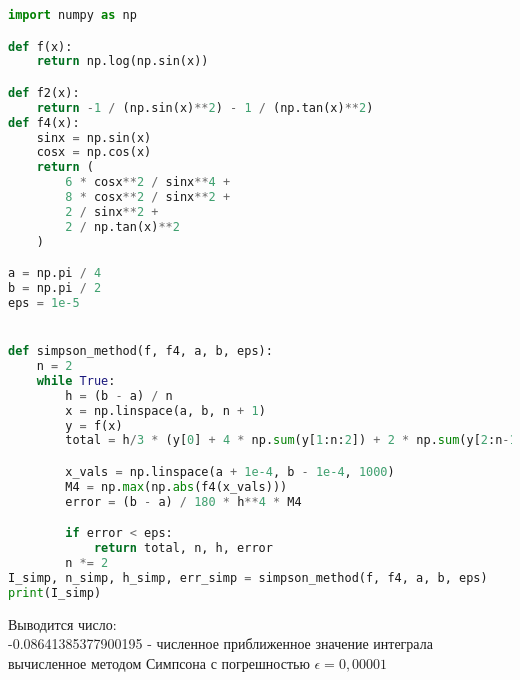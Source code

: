\documentclass{article}
\begin{document}
\begin{lstlisting}[language=Python]
import numpy as np

def f(x):
    return np.log(np.sin(x))

def f2(x):  
    return -1 / (np.sin(x)**2) - 1 / (np.tan(x)**2)
def f4(x):  
    sinx = np.sin(x)
    cosx = np.cos(x)
    return (
        6 * cosx**2 / sinx**4 +
        8 * cosx**2 / sinx**2 +
        2 / sinx**2 +
        2 / np.tan(x)**2
    )

a = np.pi / 4
b = np.pi / 2
eps = 1e-5


def simpson_method(f, f4, a, b, eps):
    n = 2
    while True:
        h = (b - a) / n
        x = np.linspace(a, b, n + 1)
        y = f(x)
        total = h/3 * (y[0] + 4 * np.sum(y[1:n:2]) + 2 * np.sum(y[2:n-1:2]) + y[n])

        x_vals = np.linspace(a + 1e-4, b - 1e-4, 1000)
        M4 = np.max(np.abs(f4(x_vals)))
        error = (b - a) / 180 * h**4 * M4

        if error < eps:
            return total, n, h, error
        n *= 2
I_simp, n_simp, h_simp, err_simp = simpson_method(f, f4, a, b, eps)
print(I_simp)
\end{lstlisting}
Выводится число:\\
-0.08641385377900195 - численное приближенное значение интеграла вычисленное методом Симпсона с погрешностью $\epsilon = 0,00001$
\end{document}
